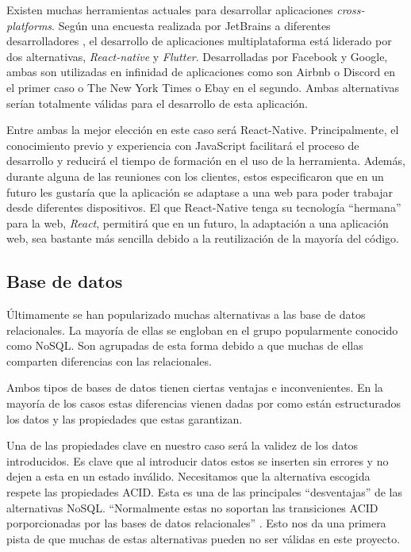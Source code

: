 Existen muchas herramientas actuales para desarrollar aplicaciones \textit{cross-platforms}. Según una encuesta realizada por JetBrains a diferentes desarrolladores \cite{jetbrains-survey}, el desarrollo de aplicaciones multiplataforma está liderado por dos alternativas, \textit{React-native} y \textit{Flutter}. Desarrolladas por Facebook y Google, ambas son utilizadas en infinidad de aplicaciones como son Airbnb o Discord en el primer caso o The New York Times o Ebay en el segundo. Ambas alternativas serían totalmente válidas para el desarrollo de esta aplicación.

Entre ambas la mejor elección en este caso será React-Native. Principalmente, el conocimiento previo y experiencia con JavaScript facilitará el proceso de desarrollo y reducirá el tiempo de formación en el uso de la herramienta. Además, durante alguna de las reuniones con los clientes, estos especificaron que en un futuro les gustaría que la aplicación se adaptase a una web para poder trabajar desde diferentes dispositivos. El que React-Native tenga su tecnología ``hermana'' para la web, \textit{React}, permitirá que en un futuro, la adaptación a una aplicación web, sea bastante más sencilla debido a la reutilización de la mayoría del código. 

\subsection{Base de datos}

Últimamente se han popularizado muchas alternativas a las base de datos relacionales. La mayoría de ellas se engloban en el grupo popularmente conocido como NoSQL. Son agrupadas de esta forma debido a que muchas de ellas comparten diferencias con las relacionales. 

Ambos tipos de bases de datos tienen ciertas ventajas e inconvenientes. En la mayoría de los casos estas diferencias vienen dadas por como están estructurados los datos y las propiedades que estas garantizan.

Una de las propiedades clave en nuestro caso será la validez de los datos introducidos. Es clave que al introducir datos estos se inserten sin errores y no dejen a esta en un estado inválido. Necesitamos que la alternativa escogida respete las propiedades ACID. Esta es una de las principales ``desventajas'' de las alternativas NoSQL.  ``Normalmente estas no soportan las transiciones ACID porporcionadas por las bases de datos relacionales'' \cite{NoSQLvsSQL_1}. Esto nos da una primera pista de que muchas de estas alternativas pueden no ser válidas en este proyecto.

